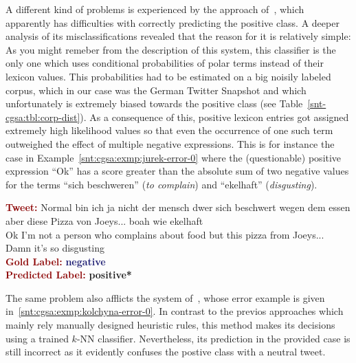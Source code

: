 A different kind of problems is experienced by the approach
of~\citet{Jurek:15}, which apparently has difficulties with correctly
predicting the positive class.  A deeper analysis of its
misclassifications revealed that the reason for it is relatively
simple: As you might remeber from the description of this system, this
classifier is the only one which uses conditional probabilities of
polar terms instead of their lexicon values.  This probabilities had
to be estimated on a big noisily labeled corpus, which in our case was
the German Twitter Snapshot and which unfortunately is extremely
biased towards the positive class (see
Table~\ref{snt-cgsa:tbl:corp-dist}).  As a consequence of this,
positive lexicon entries got assigned extremely high likelihood values
so that even the occurrence of one such term outweighed the effect of
multiple negative expressions.  This is for instance the case in
Example~\ref{snt:cgsa:exmp:jurek-error-0} where the (questionable)
positive expression ``Ok'' has a score greater than the absolute sum
of two negative values for the terms ``sich beschweren'' (\emph{to
  complain}) and ``ekelhaft'' (\emph{disgusting}).

\begin{example}\label{snt:cgsa:exmp:jurek-error-0}
  \noindent\textup{\bfseries\textcolor{darkred}{Tweet:}} {\upshape
    Normal bin ich ja nicht der mensch dwer sich beschwert wegen dem essen aber diese Pizza von Joeys... boah wie ekelhaft}\\
  \noindent Ok I'm not a person who complains about food but this pizza from Joeys... Damn it's so disgusting\\[0.65em]
  \noindent\textup{\bfseries\textcolor{darkred}{Gold Label:}}\hspace*{4.3em}\textbf{%
    \upshape\textcolor{midnightblue}{negative}}\\
 \noindent\textup{\bfseries\textcolor{darkred}{Predicted Label:}}\hspace*{2em}\textbf{%
    \upshape\textcolor{green3}{positive*}}\\
\end{example}

The same problem also afflicts the system of~\citeauthor{Kolchyna:15},
whose error example is given in~\ref{snt:cgsa:exmp:kolchyna-error-0}.
In contrast to the previos approaches which mainly rely manually
designed heuristic rules, this method makes its decisions using a
trained $k$-NN classifier.  Nevertheless, its prediction in the
provided case is still incorrect as it evidently confuses the postive
class with a neutral tweet.

